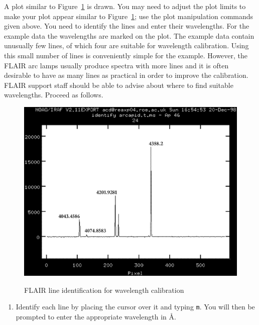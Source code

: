 \documentclass[twoside,11pt]{article}
\begin{document}
\begin{enumerate}
   A plot similar to Figure~\ref{FLAIR_WAVE} is drawn.  You may need
   to adjust the plot limits to make your plot appear similar to
   Figure~\ref{FLAIR_WAVE}; use the plot manipulation commands given
   above.  You need to identify the lines and enter their wavelengths.
   For the example data the wavelengths are marked on the plot.  The
   example data contain unusually few lines, of which four are suitable
   for wavelength calibration.  Using this small number of lines is
   conveniently simple for the example.  However, the FLAIR arc lamps
   usually produce spectra with more lines and it is often desirable to
   have as many lines as practical in order to improve the calibration.
   FLAIR support staff should be able to advise about where to find
   suitable wavelengths.  Proceed as follows.

  \begin{figure}[htbp]
     \centering
     \includegraphics[totalheight=4in]{sc14_flair_wave.ps}
     \begin{quote}
     \caption{FLAIR line identification for wavelength calibration
     \label{FLAIR_WAVE} }
     \end{quote}
  \end{figure}

  \begin{enumerate}

    \item Identify each line by placing the cursor over it and
     typing {\tt m}.  You will then be prompted to enter the
     appropriate wavelength in \AA.


\end{enumerate}
\end{enumerate}
\end{document}

